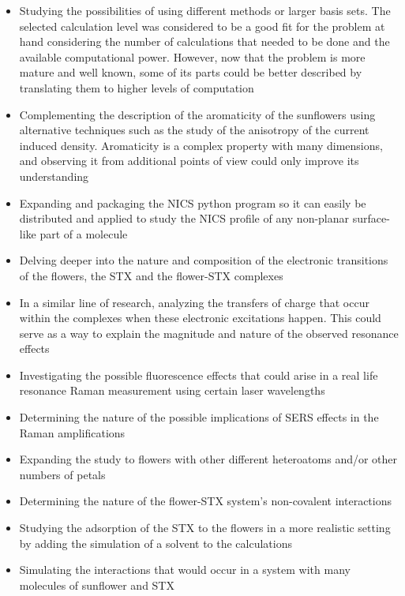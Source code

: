 \begin{itemize}
    \item Studying the possibilities of using different methods or larger basis sets. The selected calculation level was considered to be a good fit for the problem at hand considering the number of calculations that needed to be done and the available computational power. However, now that the problem is more mature and well known, some of its parts could be better described by translating them to higher levels of computation
    \item Complementing the description of the aromaticity of the sunflowers using alternative techniques such as the study of the anisotropy of the current induced density. Aromaticity is a complex property with many dimensions, and observing it from additional points of view could only improve its understanding
    \item Expanding and packaging the NICS python program so it can easily be distributed and applied to study the NICS profile of any non-planar surface-like part of a molecule
    \item Delving deeper into the nature and composition of the electronic transitions of the flowers, the STX and the flower-STX complexes
    \item In a similar line of research, analyzing the transfers of charge that occur within the complexes when these electronic excitations happen. This could serve as a way to explain the magnitude and nature of the observed resonance effects
    \item Investigating the possible fluorescence effects that could arise in a real life resonance Raman measurement using certain laser wavelengths
    \item Determining the nature of the possible implications of SERS effects in the Raman amplifications
    \item Expanding the study to flowers with other different heteroatoms and/or other numbers of petals
    \item Determining the nature of the flower-STX system's non-covalent interactions
    \item Studying the adsorption of the STX to the flowers in a more realistic setting by adding the simulation of a solvent to the calculations
    \item Simulating the interactions that would occur in a system with many molecules of sunflower and STX
\end{itemize}

